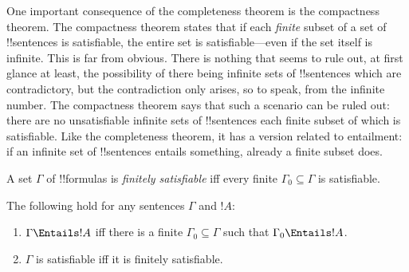 \documentclass[../../../include/open-logic-section]{subfiles}
\begin{document}
      {}
      {}

One important consequence of the completeness theorem is the
compactness theorem.  The compactness theorem states that if each
\emph{finite} subset of a set of !!{sentence}s is satisfiable, the
entire set is satisfiable---even if the set itself is infinite. This
is far from obvious. There is nothing that seems to rule out, at first
glance at least, the possibility of there being infinite sets of
!!{sentence}s which are contradictory, but the contradiction only
arises, so to speak, from the infinite number.  The compactness
theorem says that such a scenario can be ruled out: there are no
unsatisfiable infinite sets of !!{sentence}s each finite subset of
which is satisfiable. Like the completeness theorem, it has a version
related to entailment: if an infinite set of !!{sentence}s entails
something, already a finite subset does.

\begin{defn}
  A set $\Gamma$ of !!{formula}s is \emph{finitely satisfiable} iff every finite $\Gamma_0 \subseteq \Gamma$ is satisfiable.
\end{defn}

\begin{thm}
The following hold for any sentences $\Gamma$ and $!A$:
\begin{enumerate}
  \item $\Gamma \Entails !A$ iff there is a finite $\Gamma_0
    \subseteq \Gamma$ such that $\Gamma_0 \Entails !A$.
  \item $\Gamma$ is satisfiable iff it is finitely
    satisfiable.
\end{enumerate}
\end{thm}
\end{document}
